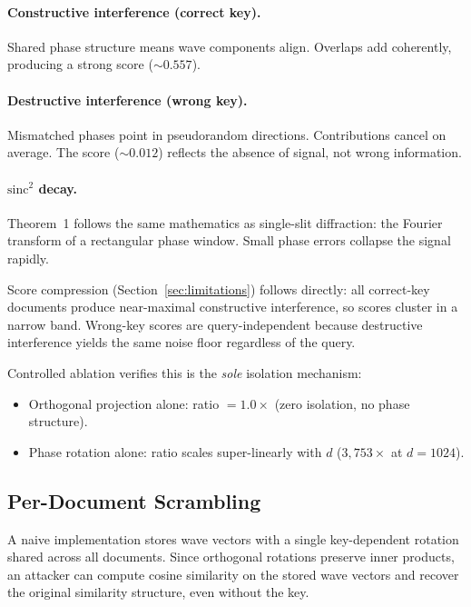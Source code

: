 \documentclass{article}
\begin{document}
\paragraph{Constructive interference (correct key).}
Shared phase structure means wave components align.
Overlaps add coherently, producing a strong score (${\sim}0.557$).

\paragraph{Destructive interference (wrong key).}
Mismatched phases point in pseudorandom directions.
Contributions cancel on average.
The score (${\sim}0.012$) reflects the absence of signal, not wrong information.

\paragraph{$\mathrm{sinc}^2$ decay.}
Theorem~1 follows the same mathematics as single-slit diffraction: the Fourier transform of a rectangular phase window.
Small phase errors collapse the signal rapidly.

Score compression (Section~\ref{sec:limitations}) follows directly: all correct-key documents produce near-maximal constructive interference, so scores cluster in a narrow band.
Wrong-key scores are query-independent because destructive interference yields the same noise floor regardless of the query.

Controlled ablation verifies this is the \emph{sole} isolation mechanism:
\begin{itemize}[nosep]
  \item Orthogonal projection alone: ratio $= 1.0\times$ (zero isolation, no phase structure).
  \item Phase rotation alone: ratio scales super-linearly with $d$ ($3{,}753\times$ at $d{=}1024$).
\end{itemize}

\subsection{Per-Document Scrambling}
\label{sec:scrambling}

A naive implementation stores wave vectors with a single key-dependent rotation shared across all documents.
Since orthogonal rotations preserve inner products, an attacker can compute cosine similarity on the stored wave vectors and recover the original similarity structure, even without the key.
\end{document}
